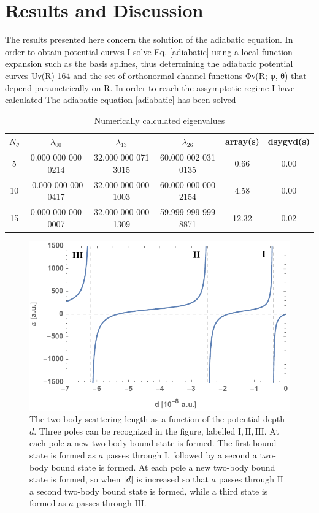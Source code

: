 \chapter{Results and Discussion}
The results presented here concern the solution of the adiabatic equation. In order to obtain potential curves I solve Eq. \eqref{adiabatic} using a local function expansion such as the basis splines, thus determining the adiabatic potential curves Uν(R)
164
and the set of orthonormal channel functions Φν(R; φ, θ) that depend parametrically on R. In order to reach the assymptotic regime 
I have calculated The adiabatic equation \eqref{adiabatic} has been solved 
\begin{table}[h!]
	\centering
	\begin{tabular}{||c c c c c c||} 
		\hline
		$N_{\theta}$ & $\lambda_{0 0}$ & $\lambda_{1 3}$ & $\lambda_{2 6}$ & array(s) & dsygvd(s)
		\\ [0.5ex] 
		\hline\hline
		5	   & 0.000 000 000 0214   & 32.000 000 071 3015 & 60.000 002 031 0135 & 0.66 & 0.00  \\
		10     & -0.000 000 000 0417  & 32.000 000 000 1003 & 60.000 000 000 2154  & 4.58 & 0.00 \\
		15 & 0.000 000 000 0007 & 32.000 000 000 1309 & 59.999 999 999 8871& 12.32& 0.02 \\  [1ex] 
		\hline
	\end{tabular}
	\caption{Numerically calculated eigenvalues}
	\label{table:2}
\end{table}

\begin{figure}
	\includegraphics[width=\linewidth]{scatteringlength.pdf}
	\caption{The two-body scattering length as a function of the potential depth $d$. Three poles can be recognized in the figure, labelled $\mathrm{I},\mathrm{II},\mathrm{III}$. At each pole a new two-body bound state is formed. The first bound state is formed as $a$ passes through $\mathrm{I}$, followed by a second a two-body bound state is formed. At each pole a new two-body bound state is formed, so when $\lvert d\rvert$ is increased so that $a$ passes through $\mathrm{II}$ a second two-body bound state is formed, while a third state is formed as $a$ passes through $\mathrm{III}$.}
	\label{fig:res_1}
\end{figure}

